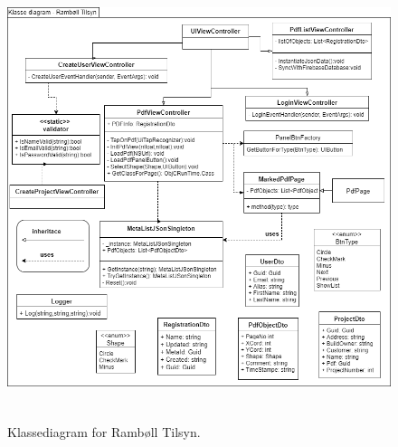 \begin{figure}[H] %
	\centering
	\includegraphics[height=13cm, width=17cm]{../ArkitekturDesign/OverordnetArkitektur/KlasseDiagram}
	\caption{Klassediagram for Rambøll Tilsyn.}
	\label{fig:KlasseDiagram}
\end{figure}
